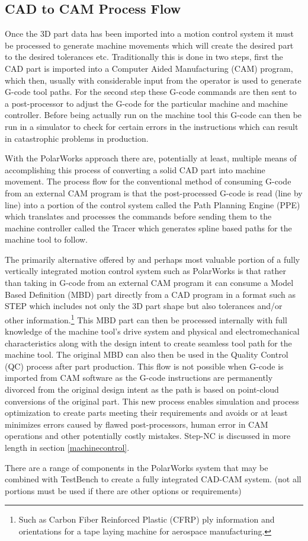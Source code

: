 \documentclass{article}
\begin{document}
\subsection{CAD to CAM Process Flow}
Once the 3D part data has been imported into a motion control system it must be processed to generate machine movements which will create the desired part to the desired tolerances etc. Traditionally this is done in two steps, first the CAD part is imported into a Computer Aided Manufacturing (CAM) program, which then, usually with considerable input from the operator is used to generate G-code tool paths. For the second step these G-code commands are then sent to a post-processor to adjust the G-code for the particular machine and machine controller. Before being actually run on the machine tool this G-code can then be run in a simulator to check for certain errors in the instructions which can result in catastrophic problems in production. 
\par
With the PolarWorks approach there are, potentially at least, multiple means of accomplishing this process of converting a solid CAD part into machine movement. The process flow for the conventional method of consuming G-code from an external CAM program is that the post-processed G-code is read (line by line) into a portion of the control system called the Path Planning Engine (PPE) which translates and processes the commands before sending them to the machine controller called the Tracer which generates spline based paths for the machine tool to follow. 
\par
The primarily alternative offered by and perhaps most valuable portion of a fully vertically integrated motion control system such as PolarWorks is that rather than taking in G-code from an external CAM program it can consume a Model Based Definition (MBD) part directly from a CAD program in a format such as STEP which includes not only the 3D part shape but also tolerances and/or other information.\footnote{Such as Carbon Fiber Reinforced Plastic (CFRP) ply information and orientations for a tape laying machine for aerospace manufacturing.} This MBD part can then be processed internally with full knowledge of the machine tool's drive system and physical and electromechanical characteristics along with the design intent to create seamless tool path for the machine tool. The original MBD can also then be used in the Quality Control (QC) process after part production. This flow is not possible when G-code is imported from CAM software as the G-code instructions are permanently divorced from the original design intent as the path is based on point-cloud conversions of the original part. This new process enables simulation and process optimization to create parts meeting their requirements and avoids or at least minimizes errors caused by flawed post-processors, human error in CAM operations and other potentially costly mistakes.  Step-NC is discussed in more length in section \ref{machinecontrol}. 
\par
There are a range of components in the PolarWorks system that may be combined with TestBench to create a fully integrated CAD-CAM system. (not all portions must be used if there are other options or requirements)
\end{document}
